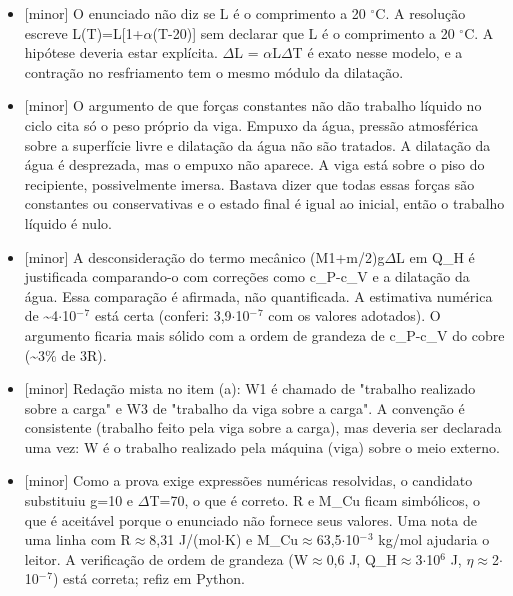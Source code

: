 \documentclass{article}%
\begin{document}
\begin{itemize}%
\item%
{[}minor{]} O enunciado não diz se L é o comprimento a 20 $^\circ$C. A resolução escreve L(T)=L{[}1+$\alpha$(T-20){]} sem declarar que L é o comprimento a 20 $^\circ$C. A hipótese deveria estar explícita. $\Delta$L = $\alpha$L$\Delta$T é exato nesse modelo, e a contração no resfriamento tem o mesmo módulo da dilatação.%
\item%
{[}minor{]} O argumento de que forças constantes não dão trabalho líquido no ciclo cita só o peso próprio da viga. Empuxo da água, pressão atmosférica sobre a superfície livre e dilatação da água não são tratados. A dilatação da água é desprezada, mas o empuxo não aparece. A viga está sobre o piso do recipiente, possivelmente imersa. Bastava dizer que todas essas forças são constantes ou conservativas e o estado final é igual ao inicial, então o trabalho líquido é nulo.%
\item%
{[}minor{]} A desconsideração do termo mecânico (M1+m/2)g$\Delta$L em Q\_H é justificada comparando{-}o com correções como c\_P-c\_V e a dilatação da água. Essa comparação é afirmada, não quantificada. A estimativa numérica de \textasciitilde{}4$\cdot$10$^{-}$$^{7}$ está certa (conferi: 3,9$\cdot$10$^{-}$$^{7}$ com os valores adotados). O argumento ficaria mais sólido com a ordem de grandeza de c\_P-c\_V do cobre (\textasciitilde{}3\% de 3R).%
\item%
{[}minor{]} Redação mista no item (a): W1 é chamado de "trabalho realizado sobre a carga" e W3 de "trabalho da viga sobre a carga". A convenção é consistente (trabalho feito pela viga sobre a carga), mas deveria ser declarada uma vez: W é o trabalho realizado pela máquina (viga) sobre o meio externo.%
\item%
{[}minor{]} Como a prova exige expressões numéricas resolvidas, o candidato substituiu g=10 e $\Delta$T=70, o que é correto. R e M\_Cu ficam simbólicos, o que é aceitável porque o enunciado não fornece seus valores. Uma nota de uma linha com R$\approx$8,31 J/(mol$\cdot$K) e M\_Cu$\approx$63,5$\cdot$10$^{-}$$^3$ kg/mol ajudaria o leitor. A verificação de ordem de grandeza (W$\approx$0,6 J, Q\_H$\approx$3$\cdot$10$^{6}$ J, $\eta$$\approx$2$\cdot$10$^{-}$$^{7}$) está correta; refiz em Python.%
\end{itemize}%
\end{document}
